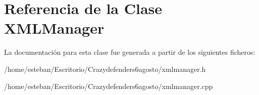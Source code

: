 \hypertarget{class_x_m_l_manager}{\section{Referencia de la Clase X\+M\+L\+Manager}
\label{class_x_m_l_manager}
}


La documentación para esta clase fue generada a partir de los siguientes ficheros\+:\begin{DoxyCompactItemize}
\item 
/home/esteban/\+Escritorio/\+Crazydefenders6agosto/xmlmanager.\+h\item 
/home/esteban/\+Escritorio/\+Crazydefenders6agosto/xmlmanager.\+cpp\end{DoxyCompactItemize}
